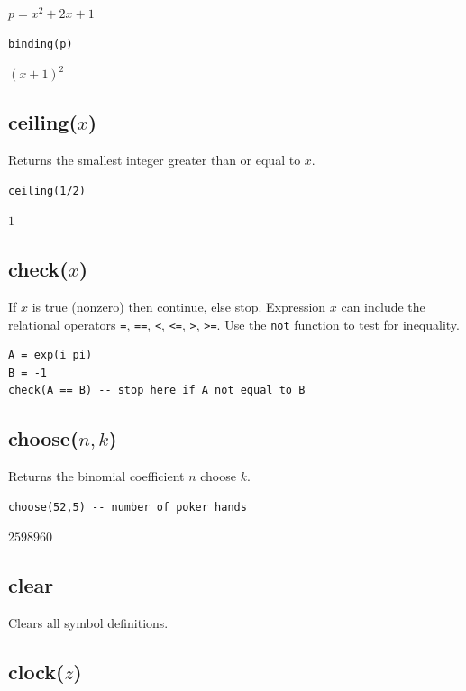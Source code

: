 \documentclass[12pt]{article}
\begin{document}
\noindent
$p=x^2+2x+1$

{\color{blue}
\begin{verbatim}
binding(p)
\end{verbatim}
}

\noindent
$(x+1)^2$

\subsection*{ceiling($x$)}

Returns the smallest integer greater than or equal to $x$.

{\color{blue}
\begin{verbatim}
ceiling(1/2)
\end{verbatim}
}

\noindent
$1$

\subsection*{check($x$)}

If $x$ is true (nonzero) then continue, else stop.
Expression $x$ can include the relational operators
\verb$=$,
\verb$==$,
\verb$<$,
\verb$<=$,
\verb$>$,
\verb$>=$.
Use the
\verb$not$
function to test for inequality.

{\color{blue}
\begin{verbatim}
A = exp(i pi)
B = -1
check(A == B) -- stop here if A not equal to B
\end{verbatim}
}

\subsection*{choose($n,k$)}

Returns the binomial coefficient $n$ choose $k$.

{\color{blue}
\begin{verbatim}
choose(52,5) -- number of poker hands
\end{verbatim}
}

\noindent
$2598960$

\subsection*{clear}

Clears all symbol definitions.

\subsection*{clock($z$)}
\end{document}
